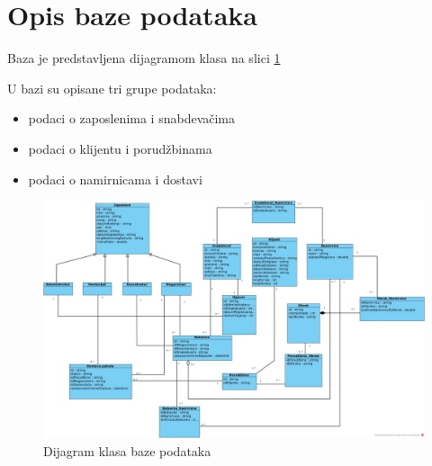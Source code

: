 \section{\bfseries Opis baze podataka}
\label{sec:database}
Baza je predstavljena dijagramom klasa na slici \ref{fig:ClassDiagramDatabase}

U bazi su opisane tri grupe podataka:
\begin{itemize}
    \item podaci o zaposlenima i snabdevačima
    \item podaci o klijentu i porudžbinama
    \item podaci o namirnicama i dostavi
\end{itemize}





\begin{figure}[H]
	\begin{center}
		\includegraphics[width=\textwidth]{Pictures/class_diagram_database.jpg}
    		\caption{Dijagram klasa baze podataka}
    \label{fig:ClassDiagramDatabase}
    \end{center}
\end{figure}
